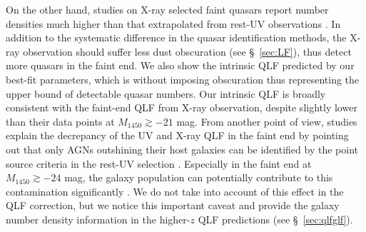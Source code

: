 \documentclass[twocolumn, twocolappendix]{aastex63}
\newcommand{\Msun}{M_\odot}
\newcommand{\Mbh}{M_\bullet}
\newcommand{\fseed}{f_\mathrm{seed}}
\newcommand{\Muv}{M_{1450}}
\begin{document}
\begin{CJK*}{UTF8}{gbsn}
On the other hand, studies on X-ray selected faint quasars report number densities much higher than that
extrapolated from rest-UV observations \citep{2015A&A...578A..83G,2019ApJ...884...19G}.
In addition to the systematic difference in the quasar identification methods,
the X-ray observation should suffer less dust obscuration (see \S~\ref{sec:LF}),
thus detect more quasars in the faint end.
We also show the intrinsic QLF predicted by our best-fit parameters,
which is without imposing obscuration thus representing the upper bound of detectable quasar numbers.
Our intrinsic QLF is broadly consistent with the faint-end QLF from X-ray observation,
despite slightly lower than their data points at $\Muv\gtrsim -21$ mag.
From another point of view, studies explain the decrepancy of the UV and X-ray QLF in the faint end
by pointing out that only AGNs outshining their host galaxies can be identified by the point source criteria
in the rest-UV selection \citep{2020MNRAS.495.2135N,2021MNRAS.502.2757O,2022arXiv220712282K}.
Especially in the faint end at $\Muv\gtrsim -24$ mag, the galaxy population can potentially contribute to this contamination significantly 
\citep{2022ApJS..259...20H}.
We do not take into account of this effect in the QLF correction,
but we notice this important caveat and provide the galaxy number density information 
in the higher-$z$ QLF predictions (see \S~\ref{sec:qlfglf}).





\end{CJK*}
\end{document}
